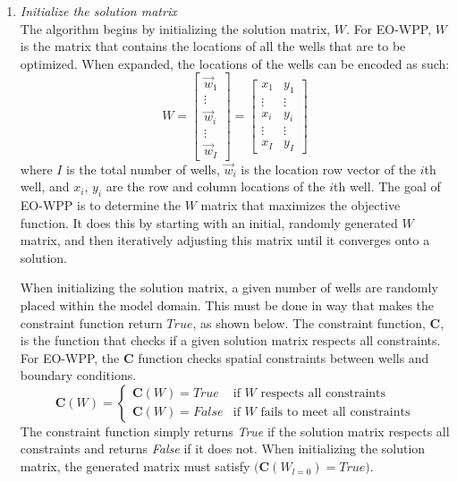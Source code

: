 \documentclass[authoryear]{elsarticle}
\begin{document}
\begin{enumerate}[Step 1:]
\item
\textit{Initialize the solution matrix}\\
The algorithm begins by initializing the solution matrix, $W$. For EO-WPP, $W$ is the matrix that contains the locations of all the wells that are to be optimized. When expanded, the locations of the wells can be encoded as such:
\begin{equation}\label{SolutionMatrix}
    W = \begin{bmatrix}
           \vec{w}_{1} \\
           \vdots\\
           \vec{w}_{i} \\
           \vdots \\
           \vec{w}_{I}
         \end{bmatrix}
      = \begin{bmatrix}
        x_{1} & y_{1}\\
        \vdots & \vdots\\
        x_{i} & y_{i}\\
        \vdots & \vdots\\
        x_{I} & y_{I}
        \end{bmatrix}
\end{equation}
where $I$ is the total number of wells, $\vec{w}_{i}$ is the location row vector of the $i$th well, and $x_{i}$, $y_{i}$ are the row and column locations of the $i$th well. The goal of EO-WPP is to determine the $W$ matrix that maximizes the objective function. It does this by starting with an initial, randomly generated $W$ matrix, and then iteratively adjusting this matrix until it converges onto a solution.

When initializing the solution matrix, a given number of wells are randomly placed within the model domain. This must be done in way that makes the constraint function return $True$, as shown below. The constraint function, $\mathbf{C}$, is the function that checks if a given solution matrix respects all constraints. For EO-WPP, the $\mathbf{C}$ function checks spatial constraints between wells and boundary conditions. 
\begin{equation}\label{Constraint Function}
\mathbf{C}(W) = \begin{cases}
\mathbf{C}(W) = \textit{True} & \text{if $W$ respects all constraints}\\
\mathbf{C}(W) = \textit{False} & \text{if $W$ fails to meet all constraints}
\end{cases}
\end{equation}
The constraint function simply returns \textit{True} if the solution matrix respects all constraints and returns \textit{False} if it does not. When initializing the solution matrix, the generated matrix must satisfy $\big(\mathbf{C}(W_{l=0}) = \textit{True}\big)$. 


\end{enumerate}
\end{document}
